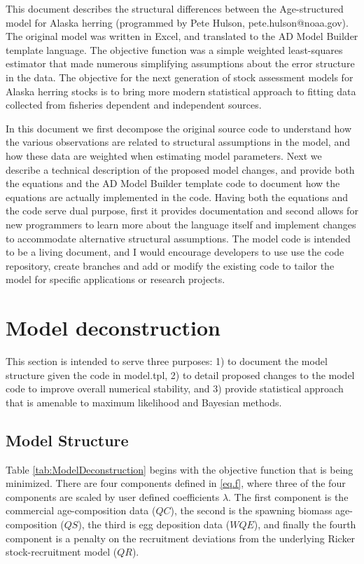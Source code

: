 \documentclass[12pt,letterpaper]{article}
\begin{document}
  This document describes the structural differences between the Age-structured model for Alaska herring (programmed by Pete Hulson, pete.hulson@noaa.gov). The original model was written in Excel, and translated to the AD Model Builder template language.  The objective function was a simple weighted least-squares estimator that made numerous simplifying assumptions about the error structure in the data.  The objective for the next generation of stock assessment models for Alaska herring stocks is to bring more modern statistical approach to fitting data collected from fisheries dependent and independent sources.  

  In this document we first decompose the original source code to understand how the various observations are related to structural assumptions in the model, and how these data are weighted when estimating model parameters.  Next we describe a technical description of the proposed model changes, and provide both the equations and the AD Model Builder template code to document how the equations are actually implemented in the code.  Having both the equations and the code serve dual purpose, first it provides  documentation and second allows for new programmers to learn more about the language itself and implement changes to accommodate alternative structural assumptions. The model code is intended to be a living document, and I would encourage developers to use use the code repository, create branches and add or modify the existing code to tailor the model for specific  applications or research projects.
  

  \section{Model deconstruction} %
  \label{sec:model_deconstruction}
  This section is intended to serve three purposes: 1) to document the model structure given the code in model.tpl,  2) to detail proposed changes to the model code to improve overall numerical stability, and 3) provide statistical approach that is amenable to maximum likelihood and Bayesian methods.

    \subsection{Model Structure} %
    \label{sub:model_structure}
    
    Table \ref{tab:ModelDeconstruction} begins with the objective function that is being minimized.   There are four components defined in \eqref{eq.f}, where three of the four components are scaled by user defined coefficients $\lambda$.  The first component is the commercial age-composition data ($QC$), the second is the spawning biomass age-composition ($QS$), the third is egg deposition data ($WQE$), and finally the fourth component is a penalty on the recruitment deviations from the underlying Ricker stock-recruitment model ($QR$).
\end{document}
